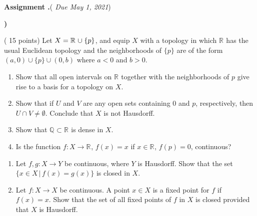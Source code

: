 \documentclass[12pt,reqno]{amsart}
\newcounter{assign}
\newenvironment{assignment}{\par\noindent\textbf{Assignment \Roman{assign}.\hskip2pt}}{\par\vskip12pt\stepcounter{assign}}
\theoremstyle{plain}
\theoremstyle{definition}
\newcommand{\Q}[1]{\mathbb{Q}^{#1}}
\newcommand{\R}[1]{\mathbb{R}^{#1}}
\newcommand\closure[2]{\overset{\raisebox{0.6pt}{\hspace{0.2em}\text{\rule{#1}{0.2mm}}}}{#2}}
\begin{document}
\begin{assignment}({\em{\color{duecolor} Due May 1, 2021}})
\begin{list}{\textbf{)}}{\setlength{\itemsep}{2pt}\setlength{\leftmargin}{15pt}\setlength{\parsep}{0pt}}
\item ({\color{pisteet} 15 points)} Let $X=\R{}\mkern0.7mu\cup\mkern0.7mu \{p\}$, and equip $X$ with a topology in which $\R{}$ has the  usual Euclidean topology and the neighborhoods of $\{p\}$ are of the form $(a,0)\cup\{p\}\cup (0,b)$ where $a<0$ and $b>0$. 
\begin{enumerate}[label=\textbf{\alph*})]
\item Show that all open intervals on $\R{}$ together with the neighborhoods of $p$ give rise to a basis for a topology on $X$.
\item Show that if $U$ and $V$ are any open sets containing $0$ and $p$, respectively, then $U\cap V\neq\emptyset$. Conclude that $X$ is not Hausdorff.
\item Show that $\Q{}\subset\R{}$ is dense in $X$.
\item Is the function $f\colon X\to\R{}$, $f(x)=x$ if $x\in\R{}$, $f(p)=0$, continuous?
\end{enumerate}
\item 
\begin{enumerate}[label=\textbf{\alph*})]
\item Let $f,g\colon X\to Y$ be continuous, where $Y$ is Hausdorff. Show that the set $\{x\in X\,\vert\,f(x)=g(x)\}$ is closed in $X$. 
\item Let $f\colon X\to X$ be continuous. A point $x\in X$ is a fixed point for $f$ if $f(x)=x$. Show that the set of all fixed points of $f$ in $X$ is closed provided that $X$ is Hausdorff.
\end{enumerate}  

\end{list}
\end{assignment}
\end{document}

